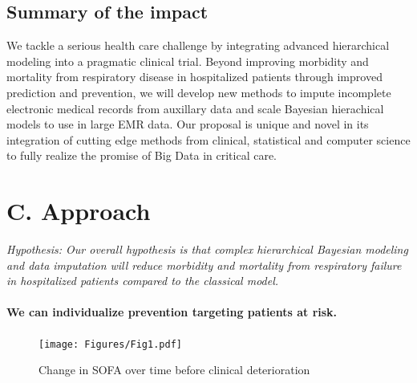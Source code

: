 \documentclass[11pt,notitlepage]{article}
\begin{document}
\subsection*{Summary of the impact}
We tackle a serious health care challenge by integrating advanced hierarchical modeling into a pragmatic clinical trial. Beyond improving morbidity and mortality from respiratory disease in hospitalized patients through improved prediction and prevention, we will develop new methods to impute incomplete electronic medical records from auxillary data and scale Bayesian hierachical models to use in large EMR data. Our proposal is unique and novel in its integration of cutting edge methods from clinical, statistical and computer science to fully realize the promise of Big Data in critical care.

\section*{C. Approach}
\begin{flushleft}
\textit{Hypothesis: Our overall hypothesis is that complex hierarchical Bayesian modeling and data imputation will reduce morbidity and mortality from respiratory failure in hospitalized patients compared to the classical model.}
\end{flushleft}

\paragraph*{We can individualize prevention targeting patients at risk.}

\begin{figure} %
\texttt{[image: Figures/Fig1.pdf]}
\caption{\footnotesize Change in SOFA over time before clinical deterioration}
\end{figure}
\end{document}

